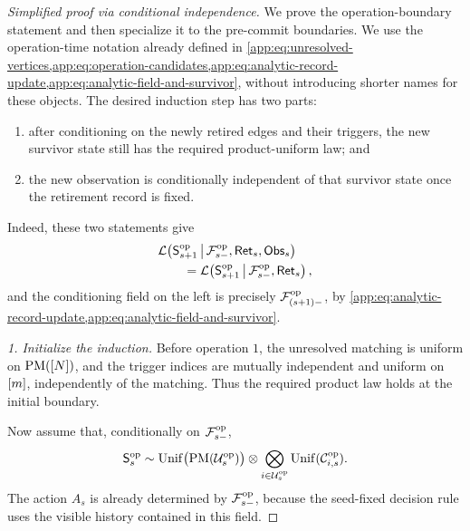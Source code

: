 {\color{blue}
\begin{proof}[Simplified proof via conditional independence]
We prove the operation-boundary statement and then specialize it to the
pre-commit boundaries.  We use the operation-time notation already defined
in \cref{app:eq:unresolved-vertices,app:eq:operation-candidates,app:eq:analytic-record-update,app:eq:analytic-field-and-survivor},
without introducing shorter names for these objects.  The desired induction
step has two parts:
\begin{enumerate}
\item after conditioning on the newly retired edges and their triggers,
the new survivor state still has the required product-uniform law; and
\item the new observation is conditionally independent of that survivor
state once the retirement record is fixed.
\end{enumerate}
Indeed, these two statements give
\begin{align*}
 &\mathcal L\!\left(
   \mathsf S^{\mathrm{op}}_{s+1}\,\middle|\,
   \mathcal F^{\mathrm{op}}_{s-},\mathsf{Ret}_{s},\mathsf{Obs}_{s}\right)\\
 &\qquad=
 \mathcal L\!\left(
   \mathsf S^{\mathrm{op}}_{s+1}\,\middle|\,
   \mathcal F^{\mathrm{op}}_{s-},\mathsf{Ret}_{s}\right),
\end{align*}
and the conditioning field on the left is precisely
\(\mathcal F^{\mathrm{op}}_{(s+1)-}\), by
\cref{app:eq:analytic-record-update,app:eq:analytic-field-and-survivor}.

\emph{1. Initialize the induction.}
Before operation \(1\), the unresolved matching is uniform on
\(\operatorname{PM}([N])\), and the trigger indices are mutually
independent and uniform on \([m]\), independently of the
matching.  Thus the required product law holds at the initial boundary.

Now assume that, conditionally on \(\mathcal F^{\mathrm{op}}_{s-}\),
\[
 \mathsf S^{\mathrm{op}}_{s}
 \sim
 \operatorname{Unif}\bigl(
   \operatorname{PM}(\mathcal U^{\mathrm{op}}_{s})\bigr)
 \otimes
 \bigotimes_{i\in\mathcal U^{\mathrm{op}}_{s}}
 \operatorname{Unif}(\mathcal C^{\mathrm{op}}_{i,s}).
\]
The action \(A_s\) is already determined by \(\mathcal F^{\mathrm{op}}_{s-}\), because
the seed-fixed decision rule uses the visible history contained in this
field.


\end{proof}}
